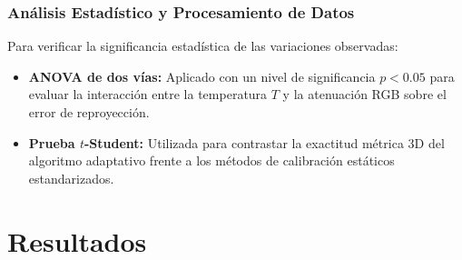 \documentclass[12pt,letterpaper,spanish,twoside,openright]{report}
\begin{document}
\subsection{Análisis Estadístico y Procesamiento de Datos}
Para verificar la significancia estadística de las variaciones observadas:
\begin{itemize}[noitemsep]
    \item \textbf{ANOVA de dos vías:} Aplicado con un nivel de significancia $p < 0.05$ para evaluar la interacción entre la temperatura $T$ y la atenuación RGB sobre el error de reproyección.
    \item \textbf{Prueba $t$-Student:} Utilizada para contrastar la exactitud métrica 3D del algoritmo adaptativo frente a los métodos de calibración estáticos estandarizados.
\end{itemize}

\chapter{Resultados}
\end{document}
